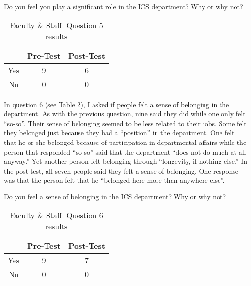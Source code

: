 \begin{table}[htb]
\caption{Faculty \& Staff: Question 5 results}
{Do you feel you play a significant role in the ICS department?  Why
  or why not?} 
\begin{center}
\begin{tabular}{|c|c|c|} \hline
  & {\bf Pre-Test} & {\bf Post-Test} \\ \hline 
 Yes & 9 & 6 \\ \hline 
 No & 0 & 0 \\ \hline 
\end{tabular}
\end{center}
\label{tab:question5a}
\end{table}

In question 6 (see Table \ref{tab:question6a}), I asked if people felt a sense
of belonging in the department.  As with the previous question, nine said they
did while one only felt ``so-so''.  Their sense of belonging seemed to be less
related to their jobs.  Some felt they belonged just because they had a
``position'' in the department.  One felt that he or she belonged because of
participation in departmental affairs while the person that responded ``so-so''
said that the department ``does not do much at all anyway.''  Yet another
person felt belonging through ``longevity, if nothing else.''  In the
post-test, all seven people said they felt a sense of belonging.  One response
was that the person felt that he ``belonged here more than anywhere else''.

\begin{table}[htb]
\caption{Faculty \& Staff: Question 6 results}
{Do you feel a sense of belonging in the ICS department?  Why or why not?}
\begin{center}
\begin{tabular}{|c|c|c|} \hline
  & {\bf Pre-Test} & {\bf Post-Test} \\ \hline 
 Yes & 9 & 7 \\ \hline 
 No & 0 & 0 \\ \hline 
\end{tabular}
\end{center}
\label{tab:question6a}
\end{table}

